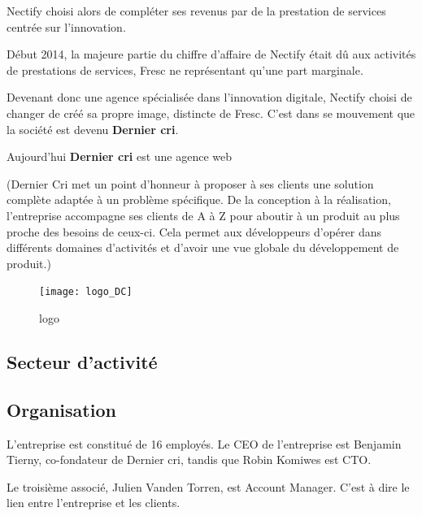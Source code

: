 \documentclass[12pt,a4paper]{article}
\begin{document}
  \bigskip

  Nectify choisi alors de compléter ses revenus par de la prestation de
  services centrée sur l'innovation.

  \bigskip

  Début 2014, la majeure partie du chiffre d'affaire de Nectify était dû
  aux activités de prestations de services, Fresc ne représentant qu'une
  part marginale.

  \bigskip

  Devenant donc une agence spécialisée dans l'innovation digitale, Nectify
  choisi de changer de créé sa propre image, distincte de Fresc. C'est
  dans se mouvement que la société est devenu \textbf{Dernier cri}.

  \bigskip

  Aujourd'hui \textbf{Dernier cri} est une agence web

  (Dernier Cri met un point d'honneur à proposer à ses clients une
  solution complète adaptée à un problème spécifique. De la conception à
  la réalisation, l'entreprise accompagne ses clients de A à Z pour
  aboutir à un produit au plus proche des besoins de ceux-ci. Cela permet
  aux développeurs d'opérer dans différents domaines d'activités et
  d'avoir une vue globale du développement de produit.)

  \bigskip

  \begin{figure}
  \centering
  \texttt{[image: logo\_DC]}
  \caption{logo}
  \end{figure}

  \newpage

  \subsection{Secteur d'activité}\label{secteur-dactivituxe9}

  \bigskip

  \subsection{Organisation}\label{organisation}

  \bigskip

  L'entreprise est constitué de 16 employés. Le CEO de l'entreprise est
  Benjamin Tierny, co-fondateur de Dernier cri, tandis que Robin Komiwes
  est CTO.

  \bigskip

  Le troisième associé, Julien Vanden Torren, est Account Manager. C'est à
  dire le lien entre l'entreprise et les clients.
\end{document}
